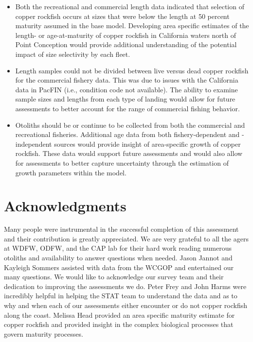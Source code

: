 \documentclass[11pt,
  english,
  a4paper,
]{article}
\begin{document}
\begin{itemize}

    \item Both the recreational and commercial length data indicated that selection of copper rockfish occurs at sizes that were below the length at 50 percent maturity assumed in the base model. Developing area specific estimates of the length- or age-at-maturity of copper rockfish in California waters north of Point Conception would provide additional understanding of the potential impact of size selectivity by each fleet.

    \item Length samples could not be divided between live versus dead copper rockfish for the commercial fishery data. This was due to issues with the California data in PacFIN (i.e., condition code not available). The ability to examine sample sizes and lengths from each type of landing would allow for future assessments to better account for the range of commercial fishing behavior.

    \item Otoliths should be or continue to be collected from both the commercial and recreational fisheries. Additional age data from both fishery-dependent and -independent sources would provide insight of area-specific growth of copper rockfish.  These data would support future assessments and would also allow for assessments to better capture uncertainty through the estimation of growth parameters within the model. 

\end{itemize}


\hypertarget{acknowledgments}{%
\section{Acknowledgments}\label{acknowledgments}}

\leavevmode\tagmcend\tagstructend


Many people were instrumental in the successful completion of this assessment and their contribution is greatly appreciated. We are very grateful to all the agers at WDFW, ODFW, and the CAP lab for their hard work reading numerous otoliths and availability to answer questions when needed. Jason Jannot and Kayleigh Sommers assisted with data from the WCGOP and entertained our many questions. We would like to acknowledge our survey team and their dedication to improving the assessments we do. Peter Frey and John Harms were incredibly helpful in helping the STAT team to understand the data and as to why and when each of our assessments either encounter or do not copper rockfish along the coast. Melissa Head provided an area specific maturity estimate for copper rockfish and provided insight in the complex biological processes that govern maturity processes.
\end{document}
